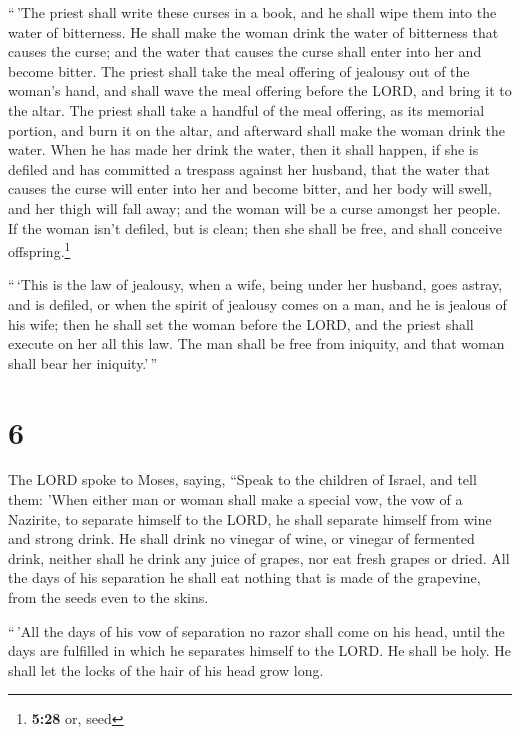  ``\,'The priest shall write these curses in a book, and
he shall wipe them into the water of bitterness.  He
shall make the woman drink the water of bitterness that causes the
curse; and the water that causes the curse shall enter into her and
become bitter.  The priest shall take the meal offering
of jealousy out of the woman's hand, and shall wave the meal offering
before the LORD, and bring it to the altar.  The priest
shall take a handful of the meal offering, as its memorial portion, and
burn it on the altar, and afterward shall make the woman drink the
water.  When he has made her drink the water, then it
shall happen, if she is defiled and has committed a trespass against her
husband, that the water that causes the curse will enter into her and
become bitter, and her body will swell, and her thigh will fall away;
and the woman will be a curse amongst her people.  If the
woman isn't defiled, but is clean; then she shall be free, and shall
conceive offspring.\footnote{\textbf{5:28} or, seed}

 ``\,`This is the law of jealousy, when a wife, being
under her husband, goes astray, and is defiled,  or when
the spirit of jealousy comes on a man, and he is jealous of his wife;
then he shall set the woman before the LORD, and the priest shall
execute on her all this law.  The man shall be free from
iniquity, and that woman shall bear her iniquity.'\,''

\hypertarget{section-5}{%
\section{6}\label{section-5}}

 The LORD spoke to Moses, saying,  ``Speak
to the children of Israel, and tell them: 'When either man or woman
shall make a special vow, the vow of a Nazirite, to separate himself to
the LORD,  he shall separate himself from wine and strong
drink. He shall drink no vinegar of wine, or vinegar of fermented drink,
neither shall he drink any juice of grapes, nor eat fresh grapes or
dried.  All the days of his separation he shall eat
nothing that is made of the grapevine, from the seeds even to the skins.

 ``\,'All the days of his vow of separation no razor shall
come on his head, until the days are fulfilled in which he separates
himself to the LORD. He shall be holy. He shall let the locks of the
hair of his head grow long.

